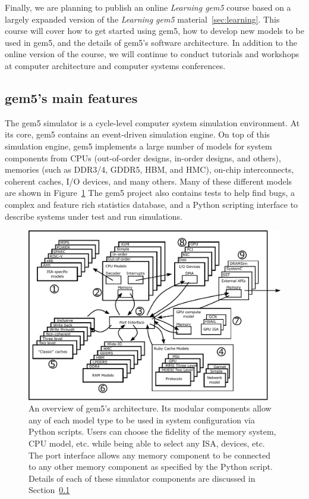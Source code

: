 Finally, we are planning to publish an online \emph{Learning gem5} course based on a largely expanded version of the \emph{Learning gem5} material~\ref{sec:learning}.
This course will cover how to get started using gem5, how to develop new models to be used in gem5, and the details of gem5's software architecture.
In addition to the online version of the course, we will continue to conduct tutorials and workshops at computer architecture and computer systems conferences.

\subsection{gem5's main features}
\label{sec:main-features}

The gem5 simulator is a cycle-level computer system simulation environment.
At its core, gem5 contains an event-driven simulation engine.
On top of this simulation engine, gem5 implements a large number of models for system components from CPUs (out-of-order designs, in-order designs, and others), memories (such as DDR3/4, GDDR5, HBM, and HMC), on-chip interconnects, coherent caches, I/O devices, and many others.
Many of these different models are shown in Figure~\ref{fig:gem5-big-picture}
The gem5 project also contains tests to help find bugs, a complex and feature rich statistics database, and a Python scripting interface to describe systems under test and run simulations.

\begin{figure}
  \centering
  \includegraphics[width=\textwidth]{fig/gem5-big-picture}
  \caption{An overview of gem5's architecture. Its modular components allow any of each model type to be used in system configuration via Python scripts. Users can choose the fidelity of the memory system, CPU model, etc. while being able to select any ISA, devices, etc. The port interface allows any memory component to be connected to any other memory component as specified by the Python script. Details of each of these simulator components are discussed in Section~\ref{sec:main-features}}
  \label{fig:gem5-big-picture}
\end{figure}


